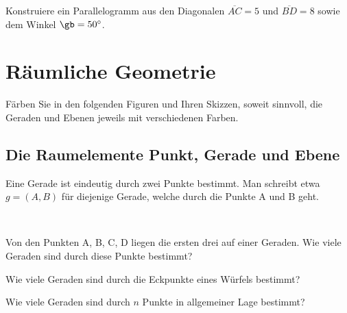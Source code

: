 \documentclass[%
11pt,%
twoside,%
titlepage,%
german,%
headsepline%
]{scrartcl}
\begin{document}
\begin{ueb}
Konstruiere ein Parallelogramm aus den Diagonalen $\overline{AC}=5$ und $\overline{BD}=8$ sowie dem Winkel $\gb=50^\circ $.
\end{ueb}

\clearpage

\section{R\"aumliche Geometrie}

\begin{bem}
F\"arben Sie in den folgenden Figuren und Ihren Skizzen, soweit sinnvoll, die Geraden und Ebenen jeweils mit verschiedenen Farben.
\end{bem}

\subsection{Die Raumelemente Punkt, Gerade und Ebene}

\begin{center}
\end{center}

Eine Gerade ist eindeutig durch zwei Punkte bestimmt. Man schreibt etwa $g=(A,B)$ f\"ur diejenige Gerade, welche durch die Punkte A und B geht.

\begin{ueb} \ \\[-4ex]
\begin{enumeratea}
\item Von den Punkten A, B, C, D liegen die ersten drei auf einer Geraden. Wie viele Geraden sind durch diese Punkte bestimmt?
\item Wie viele Geraden sind durch die Eckpunkte eines W\"urfels bestimmt?
\item Wie viele Geraden sind durch $n$ Punkte in allgemeiner Lage bestimmt?
\end{enumeratea}
\end{ueb}
\end{document}

